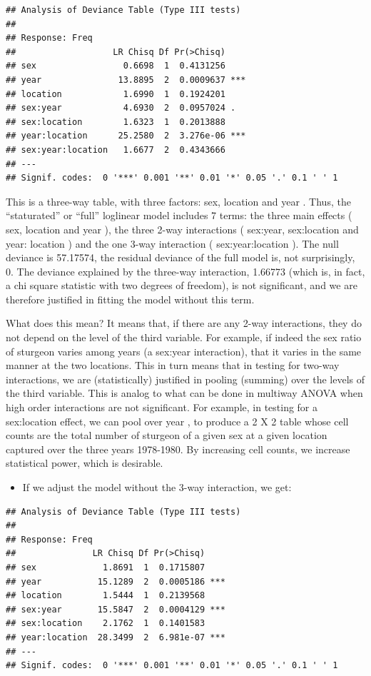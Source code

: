 \documentclass[
  12pt,
]{book}
\providecommand{\tightlist}{%
  \setlength{\itemsep}{0pt}\setlength{\parskip}{0pt}}
\begin{document}
\begin{verbatim}
## Analysis of Deviance Table (Type III tests)
## 
## Response: Freq
##                   LR Chisq Df Pr(>Chisq)    
## sex                 0.6698  1  0.4131256    
## year               13.8895  2  0.0009637 ***
## location            1.6990  1  0.1924201    
## sex:year            4.6930  2  0.0957024 .  
## sex:location        1.6323  1  0.2013888    
## year:location      25.2580  2  3.276e-06 ***
## sex:year:location   1.6677  2  0.4343666    
## ---
## Signif. codes:  0 '***' 0.001 '**' 0.01 '*' 0.05 '.' 0.1 ' ' 1
\end{verbatim}

This is a three-way table, with three factors: sex, location and year . Thus, the ``staturated'' or ``full'' loglinear model includes 7 terms: the three main effects ( sex, location and year ), the three 2-way interactions ( sex:year, sex:location and year: location ) and the one 3-way interaction ( sex:year:location ). The null deviance is 57.17574, the residual deviance of the full model is, not surprisingly, 0. The deviance explained by the three-way interaction, 1.66773 (which is, in fact, a chi square statistic with two degrees of freedom), is not significant, and we are therefore justified in fitting the model without this term.

What does this mean? It means that, if there are any 2-way interactions, they do not depend on the level of the third variable. For example, if indeed the sex ratio of sturgeon varies among years (a sex:year interaction), that it varies in the same manner at the two locations. This in turn means that in testing for two-way interactions, we are (statistically) justified in pooling (summing) over the levels of the third variable. This is analog to what can be done in multiway ANOVA when high order interactions are not significant. For example, in testing for a sex:location effect, we can pool over year , to produce a 2 X 2 table whose cell counts are the total number of sturgeon of a given sex at a given location captured over the three years 1978-1980. By increasing cell counts, we increase statistical power, which is desirable.

\begin{itemize}
\tightlist
\item
  If we adjust the model without the 3-way interaction, we get:
\end{itemize}

\begin{verbatim}
## Analysis of Deviance Table (Type III tests)
## 
## Response: Freq
##               LR Chisq Df Pr(>Chisq)    
## sex             1.8691  1  0.1715807    
## year           15.1289  2  0.0005186 ***
## location        1.5444  1  0.2139568    
## sex:year       15.5847  2  0.0004129 ***
## sex:location    2.1762  1  0.1401583    
## year:location  28.3499  2  6.981e-07 ***
## ---
## Signif. codes:  0 '***' 0.001 '**' 0.01 '*' 0.05 '.' 0.1 ' ' 1
\end{verbatim}
\end{document}
